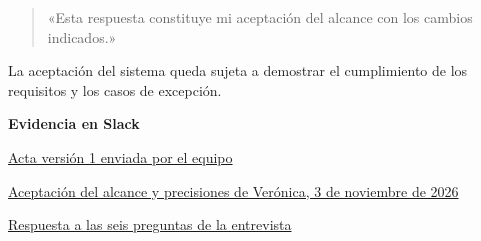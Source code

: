 \documentclass[11pt,letterpaper]{article}
\begin{document}
\begin{quote}
«Esta respuesta constituye mi aceptación del alcance con los cambios indicados.»
\end{quote}
La aceptación del sistema queda sujeta a demostrar el cumplimiento de los requisitos y los casos de excepción.

\small
\textbf{Evidencia en Slack}\par
\href{https://502-b-3-k3h8956.slack.com/archives/C0C0WDPV58T/p1793724895351619}{Acta versión 1 enviada por el equipo}\par
\href{https://502-b-3-k3h8956.slack.com/archives/C0C0WDPV58T/p1793747433731149}{Aceptación del alcance y precisiones de Verónica, 3 de noviembre de 2026}\par
\href{https://502-b-3-k3h8956.slack.com/archives/C0C0WDPV58T/p1793722197820009}{Respuesta a las seis preguntas de la entrevista}
\end{document}
